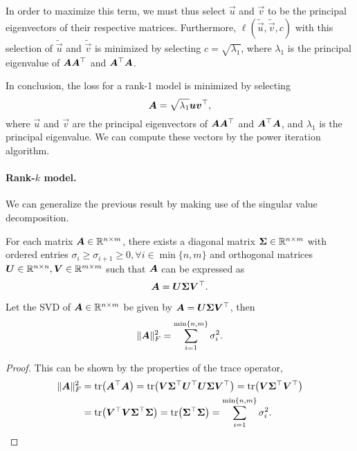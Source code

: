 In order to maximize this term, we must thus select $\vec{u}$ and $\vec{v}$ to be the principal
eigenvectors of their respective matrices. Furthermore, $\ell(\tilde{\vec{u}}, \tilde{\vec{v}}, c)$
with this selection of $\tilde{\vec{u}}$ and $\tilde{\vec{v}}$ is minimized by selecting $c =
    \sqrt{\lambda_1}$, where $\lambda_1$ is the principal eigenvalue of $\bm{A}\bm{A}^\top$
and $\bm{A}^\top \bm{A}$.

In conclusion, the loss for a rank-1 model is minimized by selecting \[
    \bm{A} = \sqrt{\lambda_1} \bm{u} \bm{v}^\top,
\]
where $\vec{u}$ and $\vec{v}$ are the principal eigenvectors of $\bm{A} \bm{A}^\top$ and
$\bm{A}^\top \bm{A}$, and $\lambda_1$ is the principal eigenvalue. We can compute these
vectors by the power iteration algorithm.

\paragraph{Rank-$k$ model.}

We can generalize the previous result by making use of the singular value decomposition.

\begin{theorem}
    For each matrix $\bm{A} \in \mathbb{R}^{n \times m}$, there exists a diagonal matrix $\bm{\Sigma} \in
        \mathbb{R}^{n \times m}$ with ordered entries $\sigma_i \geq \sigma_{i+1} \geq 0, \forall i \in
        \min\{ n,m \}$ and orthogonal matrices $\bm{U} \in \mathbb{R}^{n \times n}, \bm{V} \in \mathbb{R}^{m\times
            m}$ such that $\bm{A}$ can be expressed as \[
        \bm{A} = \bm{U} \bm{\Sigma} \bm{V}^\top.
    \]
\end{theorem}

\begin{lemma}
    Let the SVD of $\bm{A} \in \mathbb{R}^{n \times m}$ be given by $\bm{A} = \bm{U} \bm{\Sigma} \bm{V}^\top$, then \[
        \| \bm{A} \|_F^2 = \sum_{i=1}^{\min\{n,m\}} \sigma_i^2.
    \]
\end{lemma}

\begin{proof}
    This can be shown by the properties of the trace operator,
    \begin{align*}
        \| \mat{A} \|_F^2 & = \tr{\transpose{\mat{A}} \mat{A}} = \tr{\mat{V} \transpose{\mat{\Sigma}} \transpose{\mat{U}} \mat{U} \mat{\Sigma} \transpose{\mat{V}}} = \tr{\mat{V} \transpose{\mat{\Sigma}} \transpose{\mat{V}}} \\
                          & = \tr{\transpose{\mat{V}} \mat{V} \transpose{\mat{\Sigma}} \mat{\Sigma}} = \tr{\transpose{\mat{\Sigma}} \mat{\Sigma}} = \sum_{i=1}^{\min \{ n,m \}} \sigma_i^2.
    \end{align*}
\end{proof}

